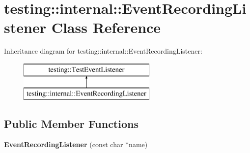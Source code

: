 \hypertarget{classtesting_1_1internal_1_1EventRecordingListener}{}\section{testing\+:\+:internal\+:\+:Event\+Recording\+Listener Class Reference}
\label{classtesting_1_1internal_1_1EventRecordingListener}
Inheritance diagram for testing\+:\+:internal\+:\+:Event\+Recording\+Listener\+:\begin{figure}[H]
\begin{center}
\leavevmode
\includegraphics[height=2.000000cm]{classtesting_1_1internal_1_1EventRecordingListener}
\end{center}
\end{figure}
\subsection*{Public Member Functions}
\begin{DoxyCompactItemize}
\item 
\mbox{\label{classtesting_1_1internal_1_1EventRecordingListener_a7b0254c15d6b8468e1441ee572fee707}} 
{\bfseries Event\+Recording\+Listener} (const char $\ast$name)
\end{DoxyCompactItemize}

